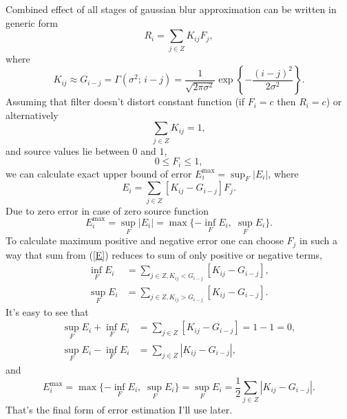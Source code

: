 \documentclass[10pt]{article}
\begin{document}
Combined effect of all stages of gaussian blur approximation can be written in generic form
\begin{equation}
    R_i = \sum_{j\in Z} K_{ij}F_j,
\end{equation}
where
\begin{equation}
    K_{ij} \approx G_{i-j} = \Gamma(\sigma^2;\, i - j) =
        \frac1{\sqrt{2\pi\sigma^2}}\exp\left\{-\frac{(i - j)^2}{2\sigma^2}\right\}.
\end{equation}
Assuming that filter doesn't distort constant function (if $F_i = c$ then $R_i = c$) or
alternatively
\begin{equation}
    \sum_{j\in Z} K_{ij} = 1,
\end{equation}
and source values lie between $0$ and $1$,
\begin{equation}
    0 \le F_i \le 1,
\end{equation}
we can calculate exact upper bound of error $E^{\max}_i = \sup_F |E_i|$, where
\begin{equation}\label{E}
    E_i = \sum_{j\in Z} [K_{ij} - G_{i-j}]F_j.
\end{equation}
Due to zero error in case of zero source function
\begin{equation}
    E^{\max}_i = \sup_F |E_i| = \max\{-\inf_F E_i,\; \sup_F E_i\}.
\end{equation}
To calculate maximum positive and negative error one can choose $F_j$ in such a way that sum from
(\ref{E}) reduces to sum of only positive or negative terms,
\begin{align}
    \inf_F E_i &= \sum_{j\in Z, K_{ij} < G_{i-j}} [K_{ij} - G_{i-j}],\\
    \sup_F E_i &= \sum_{j\in Z, K_{ij} > G_{i-j}} [K_{ij} - G_{i-j}].
\end{align}
It's easy to see that
\begin{align}
    \sup_F E_i + \inf_F E_i &= \sum_{j\in Z} [K_{ij} - G_{i-j}] = 1 - 1 = 0,\\
    \sup_F E_i - \inf_F E_i &= \sum_{j\in Z} |K_{ij} - G_{i-j}|,
\end{align}
and
\begin{equation}
    E^{\max}_i = \max\{-\inf_F E_i,\; \sup_F E_i\} = \sup_F E_i =
        \frac12\sum_{j\in Z} |K_{ij} - G_{i-j}|.
\end{equation}
That's the final form of error estimation I'll use later.
\end{document}

